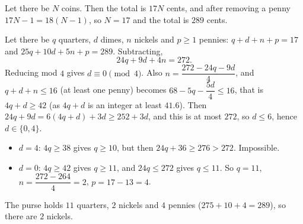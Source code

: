 Let there be $N$ coins. Then the total is $17N$ cents, and after removing a penny $17N-1=18(N-1)$, so $N=17$ and the total is $289$ cents.

Let there be $q$ quarters, $d$ dimes, $n$ nickels and $p\ge1$ pennies: $q+d+n+p=17$ and $25q+10d+5n+p=289$. Subtracting,
\[
24q+9d+4n=272 .
\]
Reducing mod $4$ gives $d\equiv0\pmod4$. Also $n=\dfrac{272-24q-9d}{4}$, and $q+d+n\le16$ (at least one penny) becomes $68-5q-\dfrac{5d}{4}\le16$, that is $4q+d\ge42$ (as $4q+d$ is an integer at least $41.6$). Then $24q+9d=6(4q+d)+3d\ge252+3d$, and this is at most $272$, so $d\le6$, hence $d\in\{0,4\}$.
\begin{itemize}
\item $d=4$: $4q\ge38$ gives $q\ge10$, but then $24q+36\ge276>272$. Impossible.
\item $d=0$: $4q\ge42$ gives $q\ge11$, and $24q\le272$ gives $q\le11$. So $q=11$, $n=\dfrac{272-264}{4}=2$, $p=17-13=4$.
\end{itemize}
The purse holds $11$ quarters, $2$ nickels and $4$ pennies ($275+10+4=289$), so there are $\boxed{2}$ nickels.
